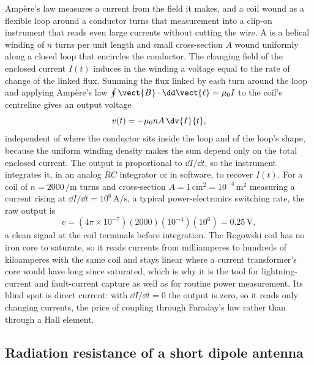 Amp\`ere's law measures a current from the field it makes, and a coil wound
as a flexible loop around a conductor turns that measurement into a
clip-on instrument that reads even large currents without cutting the wire. A
 is a helical winding of $n$ turns per unit length and
small cross-section $A$ wound uniformly along a closed loop that encircles the
conductor. The changing field of the enclosed current $I(t)$ induces in the
winding a voltage equal to the rate of change of the linked flux. Summing the
flux linked by each turn around the loop and applying Amp\`ere's law
$\oint\vect{B}\cdot\dd\vect{\ell} = \mu_0 I$ to the coil's centreline gives an
output voltage
\[
v(t) = -\mu_0 n A\,\dv{I}{t},
\]
independent of where the conductor sits inside the loop and of the loop's
shape, because the uniform winding density makes the sum depend only on the
total enclosed current. The output is proportional to $\dd I/\dd t$, so the
instrument integrates it, in an analog $RC$ integrator or in software, to
recover $I(t)$. For a coil of $n = 2000\,\si{\per\meter}$ turns and
cross-section $A = 1\,\si{\centi\meter\squared} = 10^{-4}\,\si{\meter
\squared}$ measuring a current rising at $\dd I/\dd t = 10^{6}\,\si{\ampere
\per\second}$, a typical power-electronics switching rate, the raw output is
\[
v = (4\pi\times 10^{-7})(2000)(10^{-4})(10^{6}) = 0.25\,\si{\volt},
\]
a clean signal at the coil terminals before integration. The Rogowski coil
has no iron core to saturate, so it reads currents from milliamperes to
hundreds of kiloamperes with the same coil and stays linear where a
current transformer's core would have long since saturated, which is why it
is the tool for lightning-current and fault-current capture as well as for
routine power measurement. Its blind spot is direct current: with $\dd I/
\dd t = 0$ the output is zero, so it reads only changing currents, the price
of coupling through Faraday's law rather than through a Hall element.

\subsection{Radiation resistance of a short dipole antenna}

